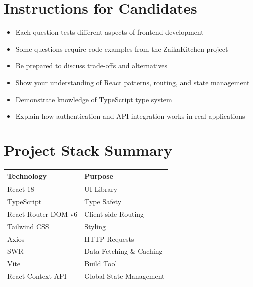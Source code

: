 \documentclass[12pt]{article}
\begin{document}
\vspace{2cm}

\section*{Instructions for Candidates}

\begin{itemize}
    \item Each question tests different aspects of frontend development
    \item Some questions require code examples from the ZaikaKitchen project
    \item Be prepared to discuss trade-offs and alternatives
    \item Show your understanding of React patterns, routing, and state management
    \item Demonstrate knowledge of TypeScript type system
    \item Explain how authentication and API integration works in real applications
\end{itemize}

\vspace{1cm}

\section*{Project Stack Summary}

\begin{center}
\begin{tabular}{|l|l|}
\hline
\textbf{Technology} & \textbf{Purpose} \\
\hline
React 18 & UI Library \\
TypeScript & Type Safety \\
React Router DOM v6 & Client-side Routing \\
Tailwind CSS & Styling \\
Axios & HTTP Requests \\
SWR & Data Fetching \& Caching \\
Vite & Build Tool \\
React Context API & Global State Management \\
\hline
\end{tabular}
\end{center}
\end{document}
